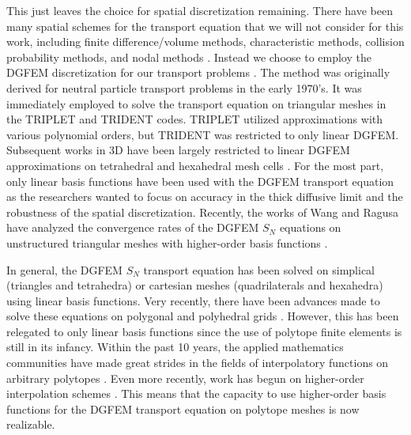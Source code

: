 \documentclass[11pt]{article}
\begin{document}
This just leaves the choice for spatial discretization remaining. There have been many spatial schemes for the transport equation that we will not consider for this work, including finite difference/volume methods, characteristic methods, collision probability methods, and nodal methods \cite{bell1979nuclear,morel1999self,askew1972characteristics,alcouffe1981review,sanchez1982review}. Instead we choose to employ the DGFEM discretization for our transport problems \cite{reed1973triangularmesh,lesaint1974finite}. The method was originally derived for neutral particle transport problems in the early 1970's. It was immediately employed to solve the transport equation on triangular meshes in the TRIPLET \cite{reed1973triplet} and TRIDENT \cite{seed1977trident,seed1978trident} codes. TRIPLET utilized approximations with various polynomial orders, but TRIDENT was restricted to only linear DGFEM. Subsequent works in 3D have been largely restricted to linear DGFEM approximations on tetrahedral and hexahedral mesh cells \cite{wareing2001discontinuous,morel2005s}. For the most part, only linear basis functions have been used with the DGFEM transport equation as the researchers wanted to focus on accuracy in the thick diffusive limit and the robustness of the spatial discretization. Recently, the works of Wang and Ragusa have analyzed the convergence rates of the DGFEM $S_N$ equations on unstructured triangular meshes with higher-order basis functions \cite{wang2009convergence,wang2009high}. 

In general, the DGFEM $S_N$ transport equation has been solved on simplical (triangles and tetrahedra) or cartesian meshes (quadrilaterals and hexahedra) using linear basis functions. Very recently, there have been advances made to solve these equations on polygonal and polyhedral grids \cite{davidson2008finite,ref::PWLD_stone_adams,ref::PWLD_stone_adams_unstructured,bailey2008phd}. However, this has been relegated to only linear basis functions since the use of polytope finite elements is still in its infancy. Within the past 10 years, the applied mathematics communities have made great strides in the fields of interpolatory functions on arbitrary polytopes \cite{sukumar2006recent}. Even more recently, work has begun on higher-order interpolation schemes \cite{rand2013interpolation}. This means that the capacity to use higher-order basis functions for the DGFEM transport equation on polytope meshes is now realizable. 
\end{document}
